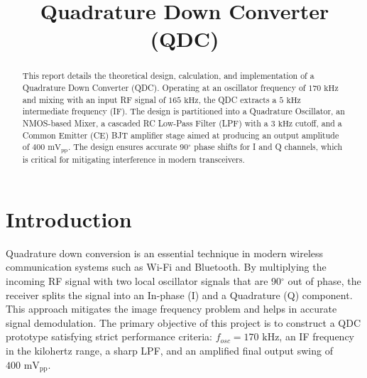 \documentclass[conference]{IEEEtran}
\begin{document}
\title{Quadrature Down Converter (QDC)
}

\author{
    \and
    \and
}

\maketitle

\begin{abstract}
This report details the theoretical design, calculation, and implementation of a Quadrature Down Converter (QDC). Operating at an oscillator frequency of $170\text{ kHz}$ and mixing with an input RF signal of $165\text{ kHz}$, the QDC extracts a $5\text{ kHz}$ intermediate frequency (IF). The design is partitioned into a Quadrature Oscillator, an NMOS-based Mixer, a cascaded RC Low-Pass Filter (LPF) with a $3\text{ kHz}$ cutoff, and a Common Emitter (CE) BJT amplifier stage aimed at producing an output amplitude of $400\text{ mV}_{\text{pp}}$. The design ensures accurate 90$^\circ$ phase shifts for I and Q channels, which is critical for mitigating interference in modern transceivers.
\end{abstract}

\section{Introduction}
Quadrature down conversion is an essential technique in modern wireless communication systems such as Wi-Fi and Bluetooth. By multiplying the incoming RF signal with two local oscillator signals that are 90$^\circ$ out of phase, the receiver splits the signal into an In-phase (I) and a Quadrature (Q) component. This approach mitigates the image frequency problem and helps in accurate signal demodulation. The primary objective of this project is to construct a QDC prototype satisfying strict performance criteria: $f_{osc} = 170\text{ kHz}$, an IF frequency in the kilohertz range, a sharp LPF, and an amplified final output swing of $400\text{ mV}_{\text{pp}}$. 
\end{document}
